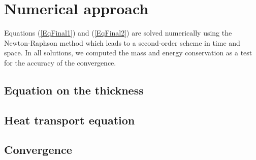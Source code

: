   \section{Numerical approach}
  \label{C3-sec:numerical-approach}

  Equations   (\ref{EqFinal1})   and   (\ref{EqFinal2})   are   solved
  numerically  using  the  Newton-Raphson  method  which  leads  to  a
  second-order scheme in time and space. In all solutions, we computed
  the mass and  energy conservation as a test for  the accuracy of the
  convergence.

  \subsection{Equation on the thickness}
  \label{C3-sec:equation-thickness}

  \subsection{Heat transport equation}
  \label{C3-sec:heat-transp-equat}

  \subsection{Convergence}
  \label{C3-sec:convergence}




